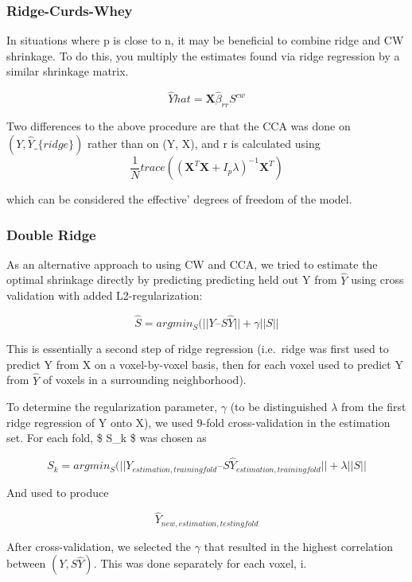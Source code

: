 \documentclass{article}
\begin{document}
\subsubsection{Ridge-Curds-Whey}\label{ridge-curds-whey}

In situations where p is close to n, it may be beneficial to combine
ridge and CW shrinkage. To do this, you multiply the estimates found via
ridge regression by a similar shrinkage matrix.

\[  \hat Yhat = \textbf{X} \hat \beta_{rr} S^{cw} \]

Two differences to the above procedure are that the CCA was done on $
(Y, \hat Y\_\{ridge\}) $ rather than on (Y, X), and r is calculated
using 
\[ \frac{1}{N} trace ((\textbf{X}^T \textbf{X} + I_p \lambda )^{-1} \textbf{X}^T) \]

which can be considered the effective' degrees of freedom of the model.

\subsubsection{Double Ridge}\label{double-ridge}

As an alternative approach to using CW and CCA, we tried to estimate the
optimal shrinkage directly by predicting predicting held out Y from $
\hat Y $ using cross validation with added L2-regularization:

\[ \hat S = argmin_{S} (||Y –  S  \hat Y|| + \gamma|| S|| \]

This is essentially a second step of ridge regression (i.e.~ridge was
first used to predict Y from X on a voxel-by-voxel basis, then for each
voxel used to predict Y from \(\hat Y\) of voxels in a surrounding
neighborhood).

To determine the regularization parameter, \(\gamma\) (to be
distinguished \(\lambda\) from the first ridge regression of Y onto X),
we used 9-fold cross-validation in the estimation set. For each fold, \$
S\_k \$ was chosen as

\[ S_k = argmin_S(||Y_{estimation,training fold} – S \hat Y_{estimation, training fold}|| + \lambda||S|| \]

And used to produce

\[ \hat Y_{new, estimation, testing fold} \]

After cross-validation, we selected the $ \gamma $ that resulted in
the highest correlation between $ (Y , S \hat Y) $. This was done
separately for each voxel, i.
\end{document}
